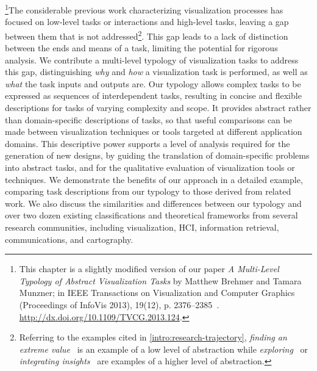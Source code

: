 \footnote{This chapter is a slightly modified version of our paper {\it A Multi-Level Typology of Abstract Visualization Tasks} by Matthew Brehmer and Tamara Munzner; in IEEE Transactions on Visualization and Computer Graphics (Proceedings of InfoVis 2013), 19(12), p. 2376--2385~\cite{Brehmer2013}. \url{http://dx.doi.org/10.1109/TVCG.2013.124}.}The considerable previous work characterizing visualization processes has focused on low-level tasks or interactions and high-level tasks, leaving a gap between them that is not addressed\footnote{Referring to the examples cited in \autoref{intro:research-trajectory}, {\it finding an extreme value}~\cite{Amar2005} is an example of a low level of abstraction while {\it exploring}~\cite{Yi2007} or {\it integrating insights}~\cite{Springmeyer1992} are examples of a higher level of abstraction.}.
This gap leads to a lack of distinction between the ends and means of a task, limiting the potential for rigorous analysis.
We contribute a multi-level typology of visualization tasks to address this gap, distinguishing {\it why} and {\it how} a visualization task is performed, as well as {\it what} the task inputs and outputs are.
Our typology allows complex tasks to be expressed as sequences of interdependent tasks, resulting in concise and flexible descriptions for tasks of varying complexity and scope.
It provides abstract rather than domain-specific descriptions of tasks, so that useful comparisons can be made between visualization techniques or tools targeted at different application domains.
This descriptive power supports a level of analysis required for the generation of new designs, by guiding the translation of domain-specific problems into abstract tasks, and for the qualitative evaluation of visualization tools or techniques.
We demonstrate the benefits of our approach in a detailed example, comparing task descriptions from our typology to those derived from related work.
We also discuss the similarities and differences between our typology and over two dozen existing classifications and theoretical frameworks from several research communities, including visualization, \ac{HCI}, information retrieval, communications, and cartography.

